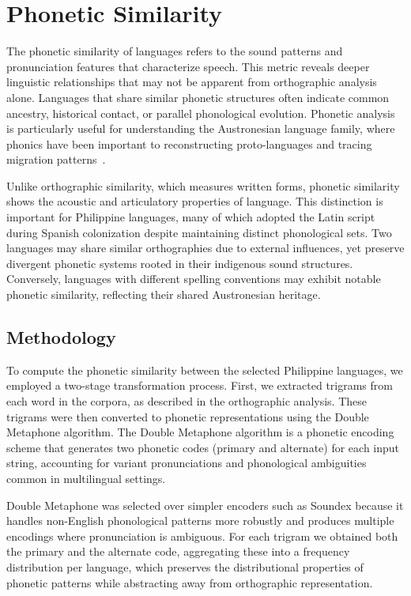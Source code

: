 \section{Phonetic Similarity}

The phonetic similarity of languages refers to the sound patterns and
pronunciation features that characterize speech. This metric reveals deeper
linguistic relationships that may not be apparent from orthographic analysis
alone. Languages that share similar phonetic structures often indicate common
ancestry, historical contact, or parallel phonological evolution. Phonetic
analysis is particularly useful for understanding the Austronesian language
family, where phonics have been important to reconstructing proto-languages and
tracing migration patterns~\cite{Blust_1991}.

Unlike orthographic similarity, which measures written forms, phonetic
similarity shows the acoustic and articulatory properties of language. This
distinction is important for Philippine languages, many of which adopted the
Latin script during Spanish colonization despite maintaining distinct
phonological sets. Two languages may share similar orthographies due to
external influences, yet preserve divergent phonetic systems rooted in their
indigenous sound structures. Conversely, languages with different spelling
conventions may exhibit notable phonetic similarity, reflecting their shared
Austronesian heritage.

\subsection{Methodology}

To compute the phonetic similarity between the selected Philippine languages,
we employed a two-stage transformation process. First, we extracted trigrams
from each word in the corpora, as described in the orthographic analysis. These
trigrams were then converted to phonetic representations using the Double
Metaphone algorithm. The Double Metaphone algorithm is a phonetic encoding
scheme that generates two phonetic codes (primary and alternate) for each input
string, accounting for variant pronunciations and phonological ambiguities
common in multilingual settings.

Double Metaphone was selected over simpler encoders such as Soundex because it
handles non-English phonological patterns more robustly and produces multiple
encodings where pronunciation is ambiguous. For each trigram we obtained both
the primary and the alternate code, aggregating these into a frequency
distribution per language, which preserves the distributional properties of
phonetic patterns while abstracting away from orthographic representation.


